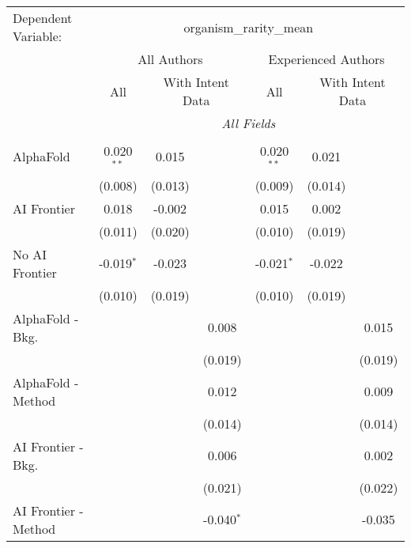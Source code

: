 \begingroup
\centering
\begin{tabular}{lcccccc}
   \tabularnewline \midrule \midrule
   Dependent Variable: & \multicolumn{6}{c}{organism\_rarity\_mean}\\
 & \multicolumn{3}{c}{All Authors} & \multicolumn{3}{c}{Experienced Authors} \\
\cmidrule(lr){2-4} \cmidrule(lr){5-7}
 & \multicolumn{1}{c}{All} & \multicolumn{2}{c}{With Intent Data} & \multicolumn{1}{c}{All} & \multicolumn{2}{c}{With Intent Data} \\
\cmidrule(lr){2-2} \cmidrule(lr){3-4} \cmidrule(lr){5-5} \cmidrule(lr){6-7}
 & \multicolumn{6}{c}{\textit{All Fields}} \\ \\
   AlphaFold               & 0.020$^{**}$ & 0.015   &              & 0.020$^{**}$ & 0.021   &   \\   
                           & (0.008)      & (0.013) &              & (0.009)      & (0.014) &   \\   
   AI Frontier             & 0.018        & -0.002  &              & 0.015        & 0.002   &   \\   
                           & (0.011)      & (0.020) &              & (0.010)      & (0.019) &   \\   
   No AI Frontier          & -0.019$^{*}$ & -0.023  &              & -0.021$^{*}$ & -0.022  &   \\   
                           & (0.010)      & (0.019) &              & (0.010)      & (0.019) &   \\   
   AlphaFold - Bkg.        &              &         & 0.008        &              &         & 0.015\\   
                           &              &         & (0.019)      &              &         & (0.019)\\   
   AlphaFold - Method      &              &         & 0.012        &              &         & 0.009\\   
                           &              &         & (0.014)      &              &         & (0.014)\\   
   AI Frontier - Bkg.      &              &         & 0.006        &              &         & 0.002\\   
                           &              &         & (0.021)      &              &         & (0.022)\\   
   AI Frontier - Method    &              &         & -0.040$^{*}$ &              &         & -0.035\\   

\end{tabular}
